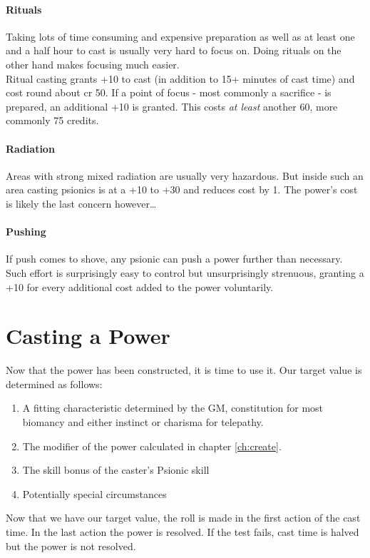 \documentclass[12pt,a4paper,openany]{book}
\begin{document}
	\subsubsection{Rituals}
	Taking lots of time consuming and expensive preparation as well as at least one and a half hour to cast is usually very hard to focus on. Doing rituals on the other hand makes focusing much easier.\\
	Ritual casting grants +10 to cast (in addition to 15+ minutes of cast time) and cost round about cr 50. If a point of focus - most commonly a sacrifice - is prepared, an additional +10 is granted. This costs \emph{at least} another 60, more commonly 75 credits.
	\subsubsection{Radiation}
	Areas with strong mixed radiation are usually very hazardous. But inside such an area casting psionics is at a +10 to +30 and reduces cost by 1. The power’s cost is likely the last concern however…
	\subsubsection{Pushing}
	If push comes to shove, any psionic can push a power further than necessary. Such effort is surprisingly easy to control but unsurprisingly strenuous, granting a +10 for every additional cost added to the power voluntarily.
	
	\chapter{Casting a Power}
	Now that the power has been constructed, it is time to use it. Our target value is determined as follows:
	\begin{enumerate}
		\item A fitting characteristic determined by the GM, constitution for most biomancy and either instinct or charisma for telepathy.
		\item The modifier of the power calculated in chapter \ref{ch:create}.
		\item The skill bonus of the caster's Psionic skill
		\item Potentially special circumstances
	\end{enumerate}
	Now that we have our target value, the roll is made in the first action of the cast time. In the last action the power is resolved. If the test fails, cast time is halved but the power is not resolved.
	
\end{document}
